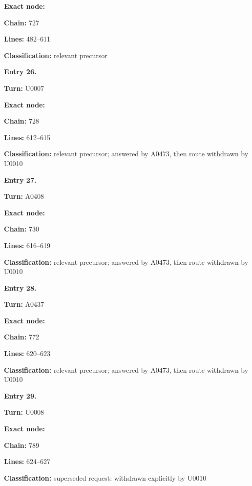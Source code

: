 \documentclass[10pt,a4paper,oneside]{report}
\begin{document}
\textbf{Exact node:} \protect{}

\textbf{Chain:} 727

\textbf{Lines:} 482--611

\textbf{Classification:} relevant precursor


\textbf{Entry 26.}

\textbf{Turn:} U0007

\textbf{Exact node:} \protect{}

\textbf{Chain:} 728

\textbf{Lines:} 612--615

\textbf{Classification:} relevant precursor; answered by A0473, then
route withdrawn by U0010


\textbf{Entry 27.}

\textbf{Turn:} A0408

\textbf{Exact node:} \protect{}

\textbf{Chain:} 730

\textbf{Lines:} 616--619

\textbf{Classification:} relevant precursor; answered by A0473, then
route withdrawn by U0010


\textbf{Entry 28.}

\textbf{Turn:} A0437

\textbf{Exact node:} \protect{}

\textbf{Chain:} 772

\textbf{Lines:} 620--623

\textbf{Classification:} relevant precursor; answered by A0473, then
route withdrawn by U0010


\textbf{Entry 29.}

\textbf{Turn:} U0008

\textbf{Exact node:} \protect{}

\textbf{Chain:} 789

\textbf{Lines:} 624--627

\textbf{Classification:} superseded request: withdrawn explicitly by
U0010

\end{document}
